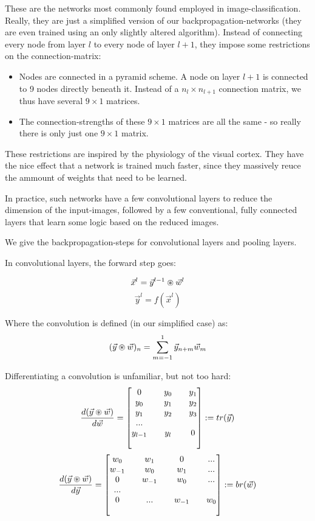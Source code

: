 These are the networks most commonly found employed in image-classification. Really, they are just a simplified version of our backpropagation-networks (they are even trained using an only slightly altered algorithm). Instead of connecting every node from layer $l$ to every node of layer $l+1$, they impose some restrictions on the connection-matrix:
\begin{itemize}
	\item Nodes are connected in a pyramid scheme. A node on layer $l+1$ is connected to 9 nodes directly beneath it. Instead of a $n_l \times n_{l+1}$ connection matrix, we thus have several $9 \times 1$ matrices.
	\item The connection-strengths of these  $9 \times 1$ matrices are all the same - so really there is only just one  $9 \times 1$ matrix. 
\end{itemize}
These restrictions are inspired by the physiology of the visual cortex. They have the nice effect that a network is trained much faster, since they massively reuce the ammount of weights that need to be learned. 

In practice, such networks have a few convolutional layers to reduce the dimension of the input-images, followed by a few conventional, fully connected layers that learn some logic based on the reduced images. 

We give the backpropagation-steps for convolutional layers and pooling layers. 

In convolutional layers, the forward step goes: 

$$ \vec{x}^l = \vec{y}^{l-1} \circledast \vec{w}^l $$
$$ \vec{y}^l = f(\vec{x}^l) $$

Where the convolution is defined (in our simplified case) as:
$$ (\vec{y} \circledast \vec{w})_n = \sum_{m=-1}^1 \vec{y}_{n+m} \vec{w}_m $$

Differentiating a convolution is unfamiliar, but not too hard: 
$$  \frac{ \mathop{d(\vec{y} \circledast \vec{w})} }{ \mathop{d\vec{w}} }  =  \begin{bmatrix} 
	0   && y_0 && y_1 \\
	y_0 && y_1 && y_2 \\
	y_1 && y_2 && y_3 \\
	... \\
	y_{l-1} && y_l && 0 \\
 \\ \end{bmatrix}  := tr(\vec{y}) $$
$$  \frac{ \mathop{d(\vec{y} \circledast \vec{w})} }{ \mathop{d\vec{y}} }  =  \begin{bmatrix} 
	w_0    && w_1    && 0   && ... \\
	w_{-1} && w_0    && w_1 && ... \\
	0      && w_{-1} && w_0 && ... \\
	...    \\
	0      && ...    && w_{-1} && w_0 \\
 \\ \end{bmatrix}  := br(\vec{w}) $$



